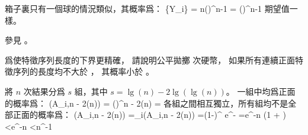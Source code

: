 箱子裏只有一個球的情況類似，其概率爲：
\startsplitformula\startmathalignment
\NC \Pr\{Y_i\} \NC = n\left(\right)^{n-1} \NR
\NC \NC = \left(\right)^{n-1} \approx {} \NR
\stopmathalignment\stopsplitformula
期望值一樣。

參見 。
\stopANSWER

\startEXERCISE \DIFFICULT
爲使特徵序列長度的下界更精確，
請說明公平拋擲  次硬幣，
如果所有連續正面特徵序列的長度均不大於 ，
其概率小於 。
\stopEXERCISE

\startANSWER
將 $n$ 次結果分爲 $s$ 組，其中 $s=\lg(n)-2\lg(\lg(n))$。
一組中均爲正面的概率爲：
\startformula
\Pr(A_{i,\lg n - 2\lg(\lg n)}) = \left(\right)^{\lg n - 2\lg(\lg n)} = 
\stopformula
各組之間相互獨立，所有組均不是全部正面的概率爲：
\startsplitformula\startmathalignment
\NC  \NC \Pr(\bigwedge\neg A_{i,\lg n - 2\lg(\lg n)}) \NR
\NC =\NC \prod_i\Pr(\neg A_{i,\lg n - 2\lg(\lg n)}) \NR
\NC =\NC \left(1-\right)^{} \NR
\NC \le\NC e^{-} \NR
\NC =\NC e^{-\lg n \left(1 + \right)} \NR
\NC <\NC e^{-\lg n} \NR
\NC <\NC n^{-1} \NR
\stopmathalignment\stopsplitformula
\stopANSWER

\stopsection
